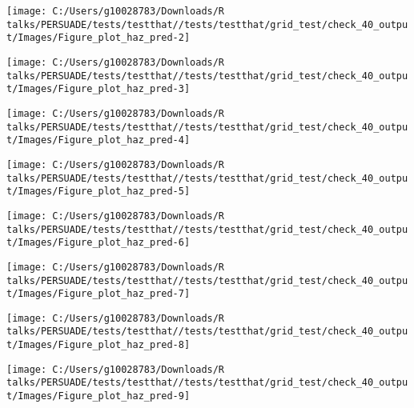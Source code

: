 \documentclass[
]{article}
\begin{document}
\begin{flushleft}\texttt{[image: C:/Users/g10028783/Downloads/R talks/PERSUADE/tests/testthat//tests/testthat/grid\_test/check\_40\_output/Images/Figure\_plot\_haz\_pred-2]} \end{flushleft}

\begin{flushleft}\texttt{[image: C:/Users/g10028783/Downloads/R talks/PERSUADE/tests/testthat//tests/testthat/grid\_test/check\_40\_output/Images/Figure\_plot\_haz\_pred-3]} \end{flushleft}

\begin{flushleft}\texttt{[image: C:/Users/g10028783/Downloads/R talks/PERSUADE/tests/testthat//tests/testthat/grid\_test/check\_40\_output/Images/Figure\_plot\_haz\_pred-4]} \end{flushleft}

\begin{flushleft}\texttt{[image: C:/Users/g10028783/Downloads/R talks/PERSUADE/tests/testthat//tests/testthat/grid\_test/check\_40\_output/Images/Figure\_plot\_haz\_pred-5]} \end{flushleft}

\begin{flushleft}\texttt{[image: C:/Users/g10028783/Downloads/R talks/PERSUADE/tests/testthat//tests/testthat/grid\_test/check\_40\_output/Images/Figure\_plot\_haz\_pred-6]} \end{flushleft}

\begin{flushleft}\texttt{[image: C:/Users/g10028783/Downloads/R talks/PERSUADE/tests/testthat//tests/testthat/grid\_test/check\_40\_output/Images/Figure\_plot\_haz\_pred-7]} \end{flushleft}

\begin{flushleft}\texttt{[image: C:/Users/g10028783/Downloads/R talks/PERSUADE/tests/testthat//tests/testthat/grid\_test/check\_40\_output/Images/Figure\_plot\_haz\_pred-8]} \end{flushleft}

\begin{flushleft}\texttt{[image: C:/Users/g10028783/Downloads/R talks/PERSUADE/tests/testthat//tests/testthat/grid\_test/check\_40\_output/Images/Figure\_plot\_haz\_pred-9]} \end{flushleft}
\end{document}
